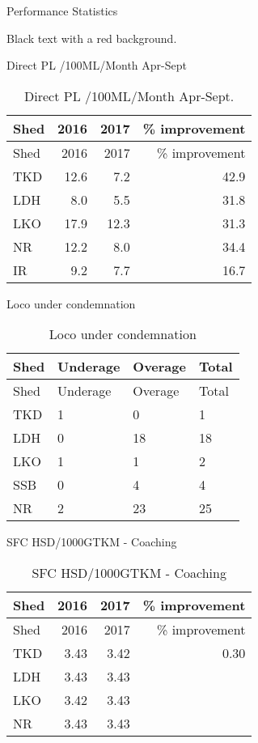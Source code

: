 \documentclass[
  ignorenonframetext,
]{beamer}
\begin{document}
\begin{frame}{Performance Statistics}
\protect\hypertarget{performance-statistics}{}
\begin{shaded}
Black text with a red background.
\end{shaded}


\begin{block}{Direct PL /100ML/Month Apr-Sept}
\protect\hypertarget{direct-pl-100mlmonth-apr-sept}{}
\begin{longtable}[]{@{}lrrr@{}}
\caption{Direct PL /100ML/Month Apr-Sept.}\tabularnewline
\toprule
Shed & 2016 & 2017 & \% improvement \\
\midrule
\endfirsthead
\toprule
Shed & 2016 & 2017 & \% improvement \\
\midrule
\endhead
TKD & 12.6 & 7.2 & 42.9 \\
LDH & 8.0 & 5.5 & 31.8 \\
LKO & 17.9 & 12.3 & 31.3 \\
NR & 12.2 & 8.0 & 34.4 \\
IR & 9.2 & 7.7 & 16.7 \\
\bottomrule
\end{longtable}
\end{block}

\begin{block}{Loco under condemnation}
\protect\hypertarget{loco-under-condemnation}{}
\begin{longtable}[]{@{}llll@{}}
\caption{Loco under condemnation}\tabularnewline
\toprule
Shed & Underage & Overage & Total \\
\midrule
\endfirsthead
\toprule
Shed & Underage & Overage & Total \\
\midrule
\endhead
TKD & 1 & 0 & 1 \\
LDH & 0 & 18 & 18 \\
LKO & 1 & 1 & 2 \\
SSB & 0 & 4 & 4 \\
NR & 2 & 23 & 25 \\
\bottomrule
\end{longtable}
\end{block}

\begin{block}{SFC HSD/1000GTKM - Coaching}
\protect\hypertarget{sfc-hsd1000gtkm---coaching}{}
\begin{longtable}[]{@{}lrrr@{}}
\caption{SFC HSD/1000GTKM - Coaching}\tabularnewline
\toprule
Shed & 2016 & 2017 & \% improvement \\
\midrule
\endfirsthead
\toprule
Shed & 2016 & 2017 & \% improvement \\
\midrule
\endhead
TKD & 3.43 & 3.42 & 0.30 \\
LDH & 3.43 & 3.43 & \\
LKO & 3.42 & 3.43 & \\
NR & 3.43 & 3.43 & \\
\bottomrule
\end{longtable}
\end{block}


\end{frame}
\end{document}
